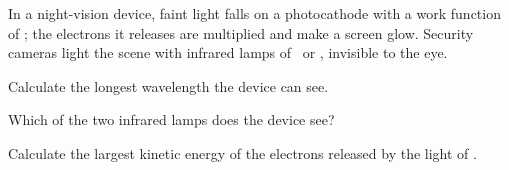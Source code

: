 In a night-vision device, faint light falls on a photocathode with a work function of \WaO; the electrons it releases are multiplied and make a screen glow. Security cameras light the scene with infrared lamps of \laO\ or \lbO, invisible to the eye.

\begin{abcliste}
\abc Calculate the longest wavelength the device can see.

\abc Which of the two infrared lamps does the device see?

\abc Calculate the largest kinetic energy of the electrons released by the light of \laO.
\end{abcliste}
